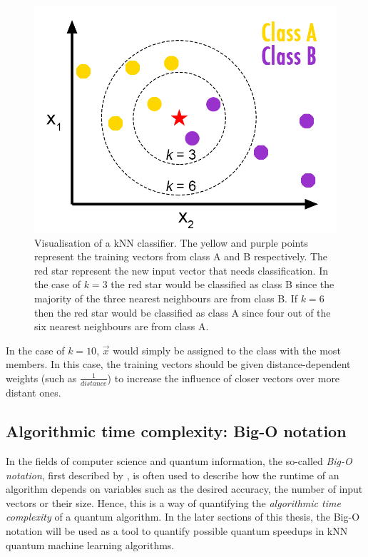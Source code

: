 \begin{figure}[H]
      \centering
       \includegraphics[scale=0.8]{img/knn-concept.png}
       \caption[]{\label{fig:knnconcept} Visualisation of a kNN classifier. The yellow and purple points represent the training vectors from class A and B respectively. The red star represent the new input vector that needs classification. In the case of $k=3$ the red star would be classified as class B since the majority of the three nearest neighbours are from class B. If $k=6$ then the red star would be classified as class A since four out of the six nearest neighbours are from class A.\footnotemark[4]}
\end{figure}


In the case of $k = 10$, $\vec{x}$ would simply be assigned to the class with the most members. In this case, the training vectors should be given distance-dependent weights (such as $\frac{1}{distance}$) to increase the influence of closer vectors over more distant ones.

\subsection{Algorithmic time complexity: Big-O notation}
\label{subsubsec:algcomplexity}

In the fields of computer science and quantum information, the so-called \emph{Big-O notation}, first described by , is often used to describe how the runtime of an algorithm depends on variables such as the desired accuracy, the number of input vectors or their size. Hence, this is a way of quantifying the \emph{algorithmic time complexity} of a quantum algorithm. In the later sections of this thesis, the Big-O notation will be used as a tool to quantify possible quantum speedups in kNN quantum machine learning algorithms.

